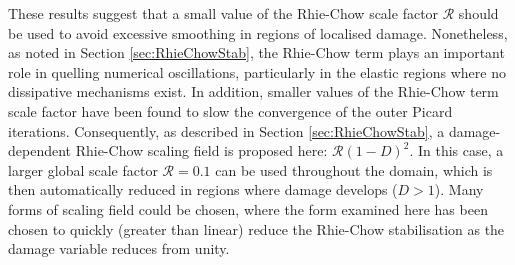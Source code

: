 \documentclass[sn-mathphys,Numbered]{sn-jnl}%
\begin{document}
These results suggest that a small value of the Rhie-Chow scale factor $\mathcal{R}$ should be used to avoid excessive smoothing in regions of localised damage.
Nonetheless, as noted in Section \ref{sec:RhieChowStab}, the Rhie-Chow term plays an important role in quelling numerical oscillations, particularly in the elastic regions where no dissipative mechanisms exist.
In addition, smaller values of the Rhie-Chow term scale factor have been found to slow the convergence of the outer Picard iterations.
Consequently, as described in Section \ref{sec:RhieChowStab}, a damage-dependent Rhie-Chow scaling field is proposed here: $\mathcal{R} (1-D)^2$.
In this case, a larger global scale factor $\mathcal{R} = 0.1$ can be used throughout the domain, which is then automatically reduced in regions where damage develops ($D > 1$).
Many forms of scaling field could be chosen, where the form examined here has been chosen to quickly (greater than linear) reduce the Rhie-Chow stabilisation as the damage variable reduces from unity.
\end{document}
